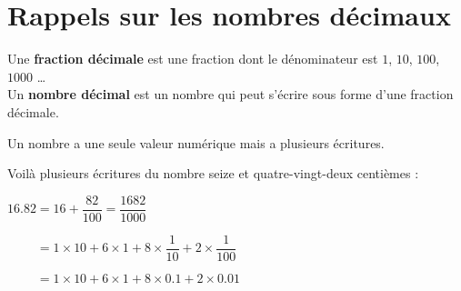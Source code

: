 \section{Rappels sur les nombres décimaux}

\begin{definition}
   Une {\bf fraction décimale} est une fraction dont le dénominateur est  $1$, $10$, $100$, $\num{1000}$ \ldots \\
   Un {\bf nombre décimal} est un nombre qui peut s'écrire sous forme d'une fraction décimale.
\end{definition}

\medskip
\begin{remarque}
    Un nombre a une seule valeur numérique mais a plusieurs écritures.
\end{remarque}
   
\begin{exemple*1}
   Voilà plusieurs écritures du nombre seize et quatre-vingt-deux centièmes : \par\smallskip
    \begin{list}{}{}
        \item $\num{16.82} = 16 + \dfrac{82}{100} = \dfrac{\num{1682}}{\num{1000}}$
        \item $\phantom{\num{16.82}} = 1\times 10 + 6\times 1 + 8\times \dfrac{1}{10} + 2\times \dfrac{1}{100}$
        \item $\phantom{\num{16.82}} = 1\times 10 + 6\times 1 + 8\times \num{0.1} + 2\times \num{0.01}$
    \end{list}
\end{exemple*1}